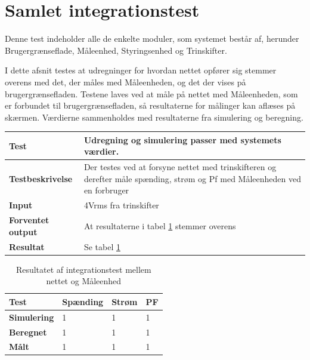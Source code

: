 
\section{Samlet integrationstest}
Denne test indeholder alle de enkelte moduler, som systemet består af, herunder Brugergrænseflade, Måleenhed, Styringsenhed og Trinskifter. 

I dette afsnit testes at udregninger for hvordan nettet opfører sig stemmer overens med det, der måles med Måleenheden, og det der vises på brugergrænsefladen.
Testene laves ved at måle på nettet med Måleenheden, som er forbundet til brugergrænsefladen, så resultaterne for målinger kan aflæses på skærmen. Værdierne sammenholdes med resultaterne fra simulering og beregning. 



\begin{center}
	\begin{tabular}{ | m{} | m{}|} 
		\hline
		\textbf{Test}					&Udregning og simulering passer med systemets værdier. \\ \hline
		\textbf{Testbeskrivelse}		&Der testes ved at forsyne nettet med trinskifteren og derefter måle spænding, strøm og Pf med Måleenheden ved en forbruger \\ \hline
		\textbf{Input}					&4Vrms fra trinskifter \\ \hline
		\textbf{Forventet output}		&At resultaterne i tabel \ref{tab:intTest2} stemmer overens \\ \hline
		\textbf{Resultat}				&Se tabel \ref{tab:intTest2} \\ \hline
	\end{tabular}
\end{center}


\begin{table}[H]
	\begin{tabular}{ | m{} | m{} | m{} | m{}|}  
		\hline
		\textbf{Test}			& \textbf{Spænding} & \textbf{Strøm}  	& \textbf{PF}			\\ \hline
		\textbf{Simulering}		&1					&1				  	&1 					\\ \hline
		\textbf{Beregnet}		&1 					&1					&1					\\ \hline
		\textbf{Målt}			&1 					&1					&1					\\ \hline
	\end{tabular}
	\caption{Resultatet af integrationstest mellem nettet og Måleenhed}
	\label{tab:intTest2}
\end{table}

